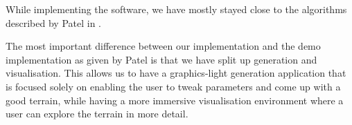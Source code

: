 While implementing the software, we have mostly stayed close to the algorithms described by Patel in \cite{redblob}.

The most important difference between our implementation and the demo implementation as given by Patel is that we have split up generation and visualisation.
This allows us to have a graphics-light generation application that is focused solely on enabling the user to tweak parameters and come up with a good terrain, while having a more immersive visualisation environment where a user can explore the terrain in more detail.
